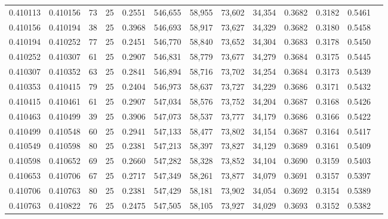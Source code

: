 \begin{tabular}{rrrrrrrrrrrrr}
0.410113 & 0.410156 &    73 &  25 &                                     0.2551 & 546,655 &  58,955 &  73,602 &  34,354 & 0.3682 & 0.3182 & 0.5461 \\
0.410156 & 0.410194 &    38 &  25 &                                     0.3968 & 546,693 &  58,917 &  73,627 &  34,329 & 0.3682 & 0.3180 & 0.5458 \\
0.410194 & 0.410252 &    77 &  25 &                                     0.2451 & 546,770 &  58,840 &  73,652 &  34,304 & 0.3683 & 0.3178 & 0.5450 \\
0.410252 & 0.410307 &    61 &  25 &                                     0.2907 & 546,831 &  58,779 &  73,677 &  34,279 & 0.3684 & 0.3175 & 0.5445 \\
0.410307 & 0.410352 &    63 &  25 &                                     0.2841 & 546,894 &  58,716 &  73,702 &  34,254 & 0.3684 & 0.3173 & 0.5439 \\
0.410353 & 0.410415 &    79 &  25 &                                     0.2404 & 546,973 &  58,637 &  73,727 &  34,229 & 0.3686 & 0.3171 & 0.5432 \\
0.410415 & 0.410461 &    61 &  25 &                                     0.2907 & 547,034 &  58,576 &  73,752 &  34,204 & 0.3687 & 0.3168 & 0.5426 \\
0.410463 & 0.410499 &    39 &  25 &                                     0.3906 & 547,073 &  58,537 &  73,777 &  34,179 & 0.3686 & 0.3166 & 0.5422 \\
0.410499 & 0.410548 &    60 &  25 &                                     0.2941 & 547,133 &  58,477 &  73,802 &  34,154 & 0.3687 & 0.3164 & 0.5417 \\
0.410549 & 0.410598 &    80 &  25 &                                     0.2381 & 547,213 &  58,397 &  73,827 &  34,129 & 0.3689 & 0.3161 & 0.5409 \\
0.410598 & 0.410652 &    69 &  25 &                                     0.2660 & 547,282 &  58,328 &  73,852 &  34,104 & 0.3690 & 0.3159 & 0.5403 \\
0.410653 & 0.410706 &    67 &  25 &                                     0.2717 & 547,349 &  58,261 &  73,877 &  34,079 & 0.3691 & 0.3157 & 0.5397 \\
0.410706 & 0.410763 &    80 &  25 &                                     0.2381 & 547,429 &  58,181 &  73,902 &  34,054 & 0.3692 & 0.3154 & 0.5389 \\
0.410763 & 0.410822 &    76 &  25 &                                     0.2475 & 547,505 &  58,105 &  73,927 &  34,029 & 0.3693 & 0.3152 & 0.5382 \\

\end{tabular}
